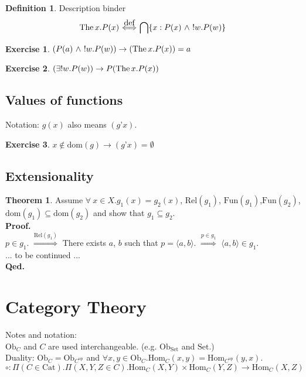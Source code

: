 \documentclass[10pt,a4paper]{article}
\theoremstyle{definition}
\newtheorem{definition}{Definition}[section]
\newtheorem{theorem}{Theorem}[section]
\newtheorem{exercise}{Exercise}[section]
\newcommand{\Fun}{{\mbox{Fun}}}
\newcommand{\Rel}{{\mbox{Rel}}}
\newcommand{\dom}{{\mbox{dom}}}
\newcommand{\apo}{{\mbox{'}}}  %
\newcommand{\The}{{\mbox{The\,}}}
\newcommand{\Ob}{{\mbox{Ob}}}
\newcommand{\Cat}{{\mbox{Cat}}}
\newcommand{\Hom}{{\mbox{Hom}}}
\newcommand{\op}{{\mbox{op}}}
\newcommand{\defi}{{\mbox{def}}}
\newcommand{\propdef}{{\stackrel{\defi}{\ \Longleftrightarrow\ }}}
\newcommand{\inter}{{\bigcap}}
\newcommand{\Set}{{\mbox{Set}}}
\newcommand{\myprf}{\noindent\textbf{Proof.}}
\newcommand{\myqed}{\noindent\textbf{Qed.}}
\begin{document}
\begin{definition} Description binder
$$\The x. P(x) \propdef \inter \{x:P(x)\ \land\ !w.P(w)\}$$
\end{definition}

\begin{exercise}
$(P(a)\ \land\ !w.P(w)) \rightarrow (\The x. P(x))=a$
\end{exercise}

\begin{exercise}
$(\exists !w.P(w)) \rightarrow P(\The x. P(x))$
\end{exercise}

\subsection{Values of functions}
Notation: $g(x)$ also means $(g\apo x).$\\

\begin{exercise}
$x\notin \dom(g)\to (g\apo x)=\emptyset$
\end{exercise}

\subsection{Extensionality}
\begin{theorem}
Assume $\forall~x\in X. g_1(x)=g_2(x)$, $\Rel(g_1)$, $\Fun(g_1)$,$\Fun(g_2)$,\\ $\dom(g_1)\subseteq\dom(g_2)$ and show that $g_1\subseteq g_2$.\\
\myprf\\
$p\in g_1$.
$\stackrel{\Rel(g_1)}{\Longrightarrow}$
There exists $a$, $b$ such that $p=\langle a, b\rangle$.
$\stackrel{p\in g_1}{\Longrightarrow}$ $\langle a, b\rangle\in g_1$.
\\
... to be continued ...
\\\myqed 
\end{theorem}

\section{Category Theory}
Notes and notation:\\
$\Ob_C$ and $C$ are used interchangeable. (e.g. $\Ob_\Set$ and $\Set$.)\\
Duality: $\Ob_C = \Ob_{C^\op}$ and 
 $\forall x,y \in \Ob_C. \Hom_C(x,y) = \Hom_{C^\op}(y,x)$.\\
$\circ : \Pi(C\in \Cat).\Pi(X,Y,Z\in C).\Hom_C(X,Y)\times\Hom_C(Y,Z)\to\Hom_C(X,Z)$
\end{document}
